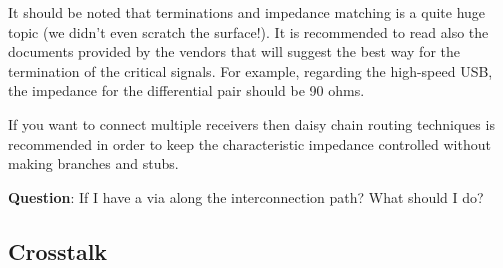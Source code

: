 \documentclass[final]{cubedoc}
\begin{document}
	It should be noted that terminations and impedance matching is a quite huge topic (we didn't even scratch the surface!). It is recommended to read also the documents provided by the vendors that will suggest the best way for the termination of the critical signals. For example, regarding the high-speed USB, the impedance for the differential pair should be 90 ohms.
	
	
	
	
	
	
	If you want to connect multiple receivers then daisy chain routing techniques is recommended in order to keep the characteristic impedance controlled without making branches and stubs.
	
	\textbf{Question}: If I have a via along the interconnection path? What should I do?
	
	\subsection{Crosstalk}
	
	
	
	
\end{document}
